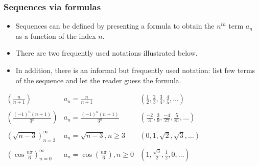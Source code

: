 \begin{frame}
\frametitle{Sequences via formulas}
\begin{itemize}
\item Sequences can be defined by presenting a formula to obtain the $n^{th}$ term $a_n$ as a function of the index $n$.
\item There are two frequently used notations illustrated below.
\item In addition, there is an informal but frequently used notation: list few terms of the sequence and let the reader guess the formula. 
\end{itemize}
\vskip -0.15cm
\begin{example}
$
\begin{array}{lll}
\left( \frac{n}{n+1}\right) &%
a_n = \frac{n}{n+1} &%
\left( \frac{1}{2}, \frac{2}{3}, \frac{3}{4}, \frac{4}{5}, \ldots \right) \\%
&&\\%
\left( \frac{(-1)^n(n+1)}{3^n}\right) &%
a_n = \frac{(-1)^n(n+1)}{3^n} &%
\left( \frac{-2}{3}, \frac{3}{9}, \frac{-4}{27}, \frac{5}{81}, \ldots \right)\\%
&&\\%
\left( \sqrt{n-3}\right)_{n=3}^\infty &%
a_n = \sqrt{n-3}, n\geq 3&%
\left( 0, 1, \sqrt{2}, \sqrt{3}, \ldots \right)\\%
&&\\%
\left( \cos \frac{n\pi}{6}\right)_{n=0}^\infty &%
a_n = \cos \left(\frac{n\pi}{6}\right), n\geq 0&%
\left( 1, \frac{\sqrt{3}}{2}, \frac{1}{2}, 0, \ldots \right)\\%
\end{array}
$
\end{example}
\end{frame}
